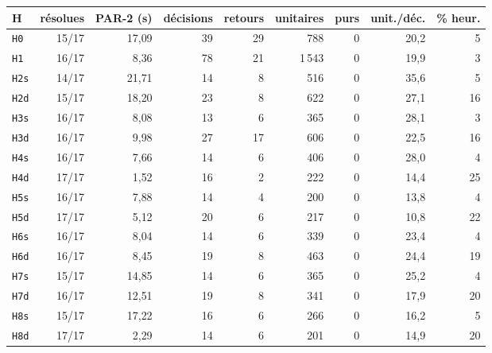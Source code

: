 \begin{tabular}{lrrrrrrrr}
\toprule
H & résolues & PAR-2 (s) & décisions & retours & unitaires & purs & unit./déc. & \% heur. \\
\midrule
\texttt{H0} & 15/17 & 17{,}09 & 39 & 29 & 788 & 0 & 20{,}2 & 5 \\
\texttt{H1} & 16/17 & 8{,}36 & 78 & 21 & 1\,543 & 0 & 19{,}9 & 3 \\
\texttt{H2s} & 14/17 & 21{,}71 & 14 & 8 & 516 & 0 & 35{,}6 & 5 \\
\texttt{H2d} & 15/17 & 18{,}20 & 23 & 8 & 622 & 0 & 27{,}1 & 16 \\
\texttt{H3s} & 16/17 & 8{,}08 & 13 & 6 & 365 & 0 & 28{,}1 & 3 \\
\texttt{H3d} & 16/17 & 9{,}98 & 27 & 17 & 606 & 0 & 22{,}5 & 16 \\
\texttt{H4s} & 16/17 & 7{,}66 & 14 & 6 & 406 & 0 & 28{,}0 & 4 \\
\texttt{H4d} & 17/17 & 1{,}52 & 16 & 2 & 222 & 0 & 14{,}4 & 25 \\
\texttt{H5s} & 16/17 & 7{,}88 & 14 & 4 & 200 & 0 & 13{,}8 & 4 \\
\texttt{H5d} & 17/17 & 5{,}12 & 20 & 6 & 217 & 0 & 10{,}8 & 22 \\
\texttt{H6s} & 16/17 & 8{,}04 & 14 & 6 & 339 & 0 & 23{,}4 & 4 \\
\texttt{H6d} & 16/17 & 8{,}45 & 19 & 8 & 463 & 0 & 24{,}4 & 19 \\
\texttt{H7s} & 15/17 & 14{,}85 & 14 & 6 & 365 & 0 & 25{,}2 & 4 \\
\texttt{H7d} & 16/17 & 12{,}51 & 19 & 8 & 341 & 0 & 17{,}9 & 20 \\
\texttt{H8s} & 15/17 & 17{,}22 & 16 & 6 & 266 & 0 & 16{,}2 & 5 \\
\texttt{H8d} & 17/17 & 2{,}29 & 14 & 6 & 201 & 0 & 14{,}9 & 20 \\
\bottomrule
\end{tabular}
